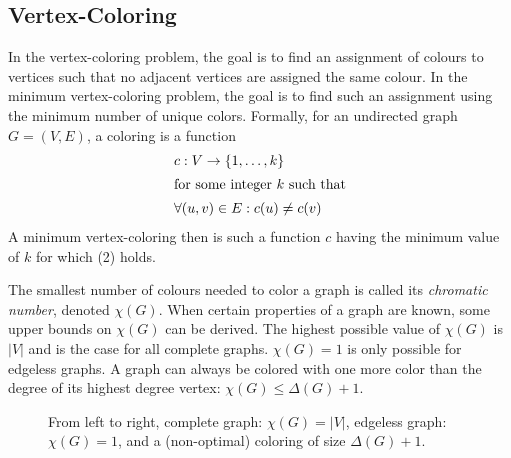 \documentclass[twocolumn]{article}
\begin{document}
\subsection{Vertex-Coloring}
In the  vertex-coloring problem, the goal is to find an assignment of colours to vertices such that no adjacent vertices are assigned the same colour. In the minimum vertex-coloring problem, the goal is to find such an assignment using the minimum number of unique colors. Formally, for an undirected graph $G = (V, E)$, a coloring is a function
\begin{align}
	&c : V \rightarrow \{1, \dots, k\} \\
	\intertext{for some integer $k$ such that}
	&\forall (u, v) \in E : c(u) \neq c(v)
\end{align}
A minimum vertex-coloring then is such a function $c$ having the minimum value of $k$ for which (2) holds. 

The smallest number of colours needed to color a graph is called its \emph{chromatic number}, denoted $\chi(G)$. When certain properties of a graph are known, some upper bounds on $\chi(G)$ can be derived. The highest possible value of $\chi(G)$ is $|V|$ and is the case for all complete graphs. $\chi(G) = 1$ is only possible for edgeless graphs. A graph can always be colored with one more color than the degree of its highest degree vertex: $\chi(G) \leq \Delta(G) + 1$.
\begin{figure}[H]
\centering
{} \hspace{1cm}
 \hspace{1cm}
\caption{From left to right, complete graph: $\chi(G) = |V|$, edgeless graph: $\chi(G) = 1$, and a (non-optimal) coloring of size $\Delta(G) + 1$.}
\label{fig:chromaticnumbers}
\end{figure}
\end{document}
